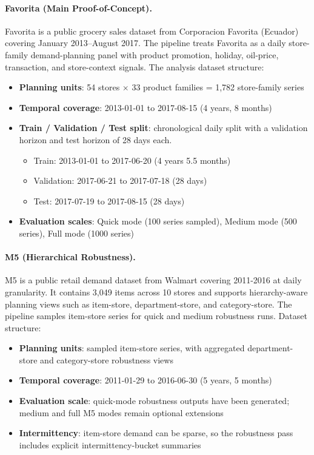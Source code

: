 \paragraph{Favorita (Main Proof-of-Concept).} Favorita is a public grocery sales dataset from Corporacion Favorita (Ecuador) covering January 2013--August 2017. The pipeline treats Favorita as a daily store-family demand-planning panel with product promotion, holiday, oil-price, transaction, and store-context signals. The analysis dataset structure:
\begin{itemize}
    \item \textbf{Planning units}: 54 stores $\times$ 33 product families = 1,782 store-family series
    \item \textbf{Temporal coverage}: 2013-01-01 to 2017-08-15 (4 years, 8 months)
    \item \textbf{Train / Validation / Test split}: chronological daily split with a validation horizon and test horizon of 28 days each.
        \begin{itemize}
            \item Train: 2013-01-01 to 2017-06-20 (4 years 5.5 months)
            \item Validation: 2017-06-21 to 2017-07-18 (28 days)
            \item Test: 2017-07-19 to 2017-08-15 (28 days)
        \end{itemize}
    \item \textbf{Evaluation scales}: Quick mode (100 series sampled), Medium mode (500 series), Full mode (1000 series)
\end{itemize}

\paragraph{M5 (Hierarchical Robustness).} M5 is a public retail demand dataset from Walmart covering 2011-2016 at daily granularity. It contains 3,049 items across 10 stores and supports hierarchy-aware planning views such as item-store, department-store, and category-store. The pipeline samples item-store series for quick and medium robustness runs. Dataset structure:
\begin{itemize}
    \item \textbf{Planning units}: sampled item-store series, with aggregated department-store and category-store robustness views
    \item \textbf{Temporal coverage}: 2011-01-29 to 2016-06-30 (5 years, 5 months)
    \item \textbf{Evaluation scale}: quick-mode robustness outputs have been generated; medium and full M5 modes remain optional extensions
    \item \textbf{Intermittency}: item-store demand can be sparse, so the robustness pass includes explicit intermittency-bucket summaries
\end{itemize}


